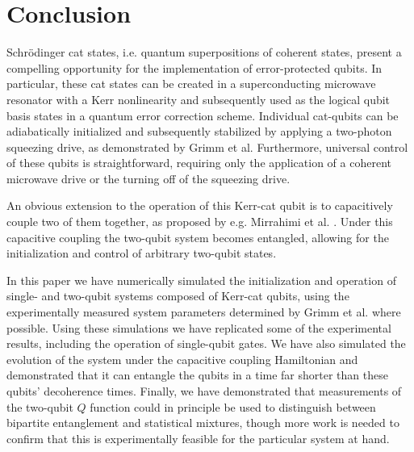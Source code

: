 \section{Conclusion}

Schr\"odinger cat states, i.e. quantum superpositions of coherent states, present a compelling opportunity for the implementation of error-protected qubits.
In particular, these cat states can be created in a superconducting microwave resonator with a Kerr nonlinearity and subsequently used as the logical qubit basis states in a quantum error correction scheme.
Individual cat-qubits can be adiabatically initialized and subsequently stabilized by applying a two-photon squeezing drive, as demonstrated by Grimm et al. \cite{grimm_2020}
Furthermore, universal control of these qubits is straightforward, requiring only the application of a coherent microwave drive or the turning off of the squeezing drive.

An obvious extension to the operation of this Kerr-cat qubit is to capacitively couple two of them together, as proposed by e.g. Mirrahimi et al. \cite{mirrahimi_2014}.
Under this capacitive coupling the two-qubit system becomes entangled, allowing for the initialization and control of arbitrary two-qubit states.

In this paper we have numerically simulated the initialization and operation of single- and two-qubit systems composed of Kerr-cat qubits, using the experimentally measured system parameters determined by Grimm et al. \cite{grimm_2020} where possible.
Using these simulations we have replicated some of the experimental results, including the operation of single-qubit gates.
We have also simulated the evolution of the system under the capacitive coupling Hamiltonian and demonstrated that it can entangle the qubits in a time far shorter than these qubits' decoherence times.
Finally, we have demonstrated that measurements of the two-qubit $Q$ function could in principle be used to distinguish between bipartite entanglement and statistical mixtures, though more work is needed to confirm that this is experimentally feasible for the particular system at hand.

